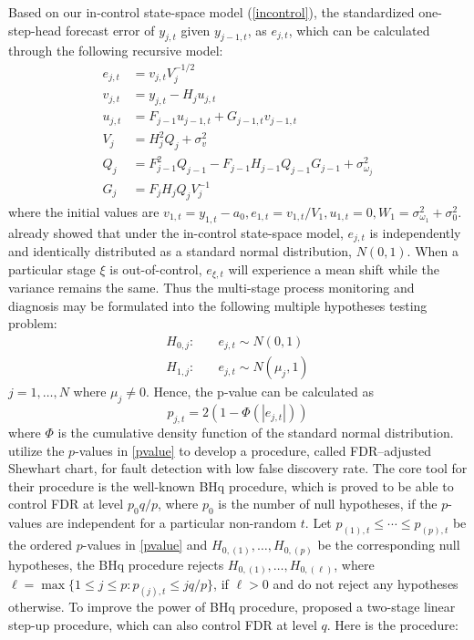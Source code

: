 \documentclass[]{interact}
\theoremstyle{plain}%
\theoremstyle{definition}
\theoremstyle{remark}
\begin{document}
Based on our in-control state-space model (\ref{incontrol}), the standardized one-step-head forecast error of $y_{j,t}$ given $y_{j-1,t}$, as $e_{j,t}$, which can be calculated through the following recursive model:
\begin{equation}\label{recur}
\begin{split}
e_{j,t} &= v_{j,t} V_j^{-1/2} \\
v_{j,t} &= y_{j,t} - H_j u_{j,t} \\
u_{j,t} &= F_{j-1} u_{j-1,t} + G_{j-1,t} v_{j-1,t} \\
V_j &= H_j^2 Q_j + \sigma^2_v \\
Q_j &= F_{j-1}^2 Q_{j-1} - F_{j-1} H_{j-1} Q_{j-1} G_{j-1} + \sigma^2_{\omega_j} \\
G_j &= F_j H_j Q_j V_j^{-1}
\end{split}
\end{equation}
where the initial values are $v_{1,t} = y_{1,t} - a_0, e_{1,t} = v_{1,t}/V_1, u_{1,t} = 0, W_1 = \sigma^2_{\omega_1} + \sigma_0^2$. \cite{durbin2012time} already showed that under the in-control state-space model, $e_{j,t}$ is independently and identically distributed as a standard normal distribution, $ N(0,1)$. When a particular stage $\xi$ is out-of-control, $e_{\xi,t}$ will experience a mean shift while the variance remains the same. Thus the multi-stage process monitoring and diagnosis may be formulated into the following multiple hypotheses testing problem:
\begin{equation}\label{hypo1}
\begin{split}
H_{0,j}: &\quad e_{j,t} \sim  N(0,1)\\ 
H_{1,j}: &\quad e_{j,t} \sim N(\mu_j,1)
\end{split}
\end{equation}
$j =1, \ldots, N$  where $\mu_j \ne 0$. Hence, the p-value can be calculated as
\begin{equation}\label{pvalue}
p_{j,t} = 2 \left ( 1 - \Phi(|e_{j,t}|)\right)
\end{equation}
where $\Phi$ is the cumulative density function of the standard normal distribution. \cite{li2009false} utilize the $p$-values in \eqref{pvalue} to develop a procedure, called FDR–adjusted Shewhart chart, for fault detection with low false discovery rate. The core tool for their procedure is the well-known BHq procedure, which is proved to be able to control FDR at level $p_0q/p$, where $p_0$ is the number of null hypotheses, if the $p$-values are independent for a particular non-random $t$. Let $p_{(1),t}\leq\cdots\leq  p_{(p),t}$ be the ordered $p$-values in \eqref{pvalue} and $H_{0,(1)},\ldots,H_{0,(p)}$ be the corresponding null hypotheses, the BHq procedure rejects $H_{0,(1)},\ldots,H_{0,(\ell)}$, where $\ell=\max\{1\leq j\leq p:p_{(j),t}\leq jq/p\}$, if $\ell>0$ and do not reject any hypotheses otherwise. To improve the power of BHq procedure, \cite{benjamini2006adaptive} proposed a two-stage linear step-up procedure, which can also control FDR at level $q$. Here is the procedure:
\end{document}
